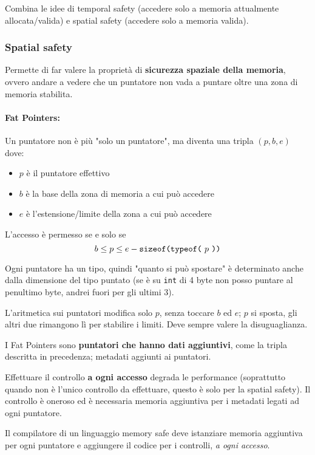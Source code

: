 Combina le idee di temporal safety (accedere solo a memoria attualmente allocata/valida) e spatial safety (accedere solo a memoria valida).

\subsubsection{Spatial safety}

Permette di far valere la proprietà di \textbf{sicurezza spaziale della memoria}, ovvero andare a vedere che un puntatore non vada a puntare oltre una zona di memoria stabilita.

\paragraph{Fat Pointers:} Un puntatore non è più "solo un puntatore", ma diventa una tripla $(p,b,e)$ dove:
\label{par:fat-pointers}
\begin{itemize}
	\item $p$ è il puntatore effettivo
    
	\item $b$ è la base della zona di memoria a cui può accedere
	
    \item $e$ è l'estensione/limite della zona a cui può accedere
\end{itemize}

L'accesso è permesso se e solo se 
$$b \leq p \leq e - \text{\texttt{sizeof(typeof(} $p$ \text{\texttt{))}}} $$

Ogni puntatore ha un tipo, quindi "quanto si può spostare" è determinato anche dalla dimensione del tipo puntato (se è su \texttt{int} di 4 byte non posso puntare al penultimo byte, andrei fuori per gli ultimi 3). 

L'aritmetica sui puntatori modifica solo $p$, senza toccare $b$ ed $e$; $p$ si sposta, gli altri due rimangono lì per stabilire i limiti. Deve sempre valere la disuguaglianza.

I Fat Pointers sono \textbf{puntatori che hanno dati aggiuntivi}, come la tripla descritta in precedenza; metadati aggiunti ai puntatori. 

Effettuare il controllo \textbf{a ogni accesso} degrada le performance (soprattutto quando non è l'unico controllo da effettuare, questo è solo per la spatial safety). Il controllo è oneroso ed è necessaria memoria aggiuntiva per i metadati legati ad ogni puntatore.

Il compilatore di un linguaggio memory safe deve istanziare memoria aggiuntiva per ogni puntatore e aggiungere il codice per i controlli, \textit{a ogni accesso}.

